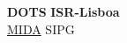 \documentclass{article}
\begin{document}
\noindent
\large\textbf{DOTS} \hfill \textbf{ISR-Lisboa} \\
\normalsize
\hyperlink{https://mida-project.github.io/}{MIDA} \hfill SIPG \\



\clearpage


\end{document}
